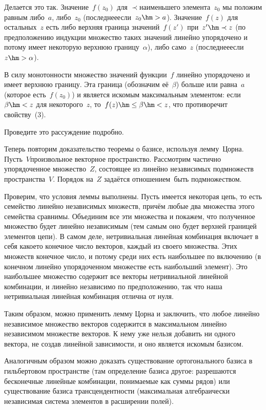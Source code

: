 Делается это так. Значение~$f(z_0)$ для $\prec$\д наименьшего
элемента~$z_0$ мы положим равным либо~$a$, либо~$z_0$
(последнее\т если~$z_0 \hm> a$). Значение~$f(z)$ для остальных~$z$
есть либо верхняя граница значений~$f(z')$ при~$z'\hm\prec z$
(по предположению
индукции множество таких значений линейно
упорядочено и потому имеет некоторую верхнюю
границу~$\alpha$), либо само~$z$ (последнее\т если~$z\hm>\alpha$).

В силу монотонности множество значений функции~$f$ линейно
упорядочено и имеет верхнюю границу. Эта граница (обозначим
её~$\beta$) больше или равна~$a$ (которое есть~$f(z_0)$) и
является искомым максимальным элементом: если~$\beta \hm< z$ для
некоторого~$z$, то~$f(z)\hm\le\beta\hm<z$, что противоречит
свойству~(3).

\begin{problem}
Проведите это рассуждение подробно.
\end{problem}

\problskip
Теперь повторим доказательство теоремы о базисе, используя лемму~Цорна.
Пусть~$V$\т произвольное векторное пространство.
Рассмотрим частично упорядоченное множество~$Z$, состоящее из
линейно независимых подмножеств пространства~$V$. Порядок
на~$Z$ задаётся отношением~ быть подмножеством.

Проверим, что условия леммы выполнены. Пусть имеется некоторая
цепь, то есть семейство линейно независимых множеств, причём
любые два множества этого семейства сравнимы. Объединим все эти
множества и покажем, что полученное множество будет линейно
независимым (тем самым оно будет верхней границей элементов
цепи). В самом деле, нетривиальная линейная комбинация включает
в себя какое\д то конечное число векторов, каждый из своего
множества. Этих множеств конечное число, и потому среди них есть
наибольшее по включению (в конечном линейно упорядоченном
множестве есть наибольший элемент). Это наибольшее множество
содержит все векторы нетривиальной линейной комбинации, и
линейно независимо по предположению, так что наша нетривиальная
линейная комбинация отлична от нуля.

Таким образом, можно применить лемму Цорна и заключить, что
любое линейно независимое множество векторов содержится в
максимальном линейно независимом множестве векторов. К нему
уже нельзя добавить ни одного вектора, не создав линейной
зависимости, и оно является искомым
базисом.

Аналогичным образом можно доказать существование ортогонального
базиса в
гильбертовом пространстве (там определение базиса другое: разрешаются
бесконечные линейные комбинации, понимаемые как суммы рядов) или
существование базиса трансцендентности (максимальная
алгебраически независимая система элементов в расширении полей).

